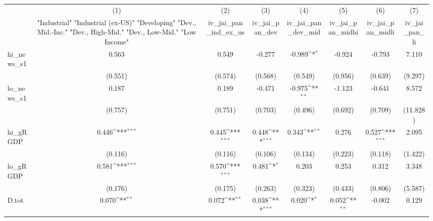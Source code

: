 {
\def\sym#1{\ifmmode^{#1}\else\(^{#1}\)\fi}
\begin{tabular}{l*{7}{c}}
\toprule
            &\multicolumn{1}{c}{(1)}&\multicolumn{1}{c}{(2)}&\multicolumn{1}{c}{(3)}&\multicolumn{1}{c}{(4)}&\multicolumn{1}{c}{(5)}&\multicolumn{1}{c}{(6)}&\multicolumn{1}{c}{(7)}\\
            &\multicolumn{1}{c}{ "Industrial" "Industrial (ex-US)" "Developing" "Dev., Mid.-Inc." "Dev., High-Mid."  "Dev., Low-Mid." "Low Income" }&\multicolumn{1}{c}{iv\_jai\_pan\_ind\_ex\_us}&\multicolumn{1}{c}{iv\_jai\_pan\_dev}&\multicolumn{1}{c}{iv\_jai\_pan\_dev\_mid}&\multicolumn{1}{c}{iv\_jai\_pan\_midhi}&\multicolumn{1}{c}{iv\_jai\_pan\_midli}&\multicolumn{1}{c}{iv\_jai\_pan\_li}\\
\midrule
hi\_news\_s1  &       0.563         &       0.549         &      -0.277         &      -0.989\sym{*}  &      -0.924         &      -0.793         &       7.110         \\
            &     (0.551)         &     (0.574)         &     (0.568)         &     (0.549)         &     (0.956)         &     (0.639)         &     (9.297)         \\
\addlinespace
lo\_news\_s1  &       0.187         &       0.189         &      -0.471         &      -0.975\sym{**} &      -1.123         &      -0.641         &       8.572         \\
            &     (0.757)         &     (0.751)         &     (0.703)         &     (0.496)         &     (0.692)         &     (0.709)         &    (11.828)         \\
\addlinespace
hi\_gRGDP    &       0.446\sym{***}&       0.445\sym{***}&       0.448\sym{***}&       0.343\sym{**} &       0.276         &       0.527\sym{***}&       2.095         \\
            &     (0.116)         &     (0.116)         &     (0.106)         &     (0.134)         &     (0.223)         &     (0.118)         &     (1.422)         \\
\addlinespace
lo\_gRGDP    &       0.581\sym{***}&       0.570\sym{***}&       0.481\sym{*}  &       0.203         &       0.253         &       0.312         &       3.348         \\
            &     (0.176)         &     (0.175)         &     (0.263)         &     (0.323)         &     (0.433)         &     (0.806)         &     (5.587)         \\
\addlinespace
D.tot       &       0.070\sym{**} &       0.072\sym{**} &       0.038\sym{***}&       0.020\sym{*}  &       0.052\sym{**} &      -0.002         &       0.129         \\

\end{tabular}}
